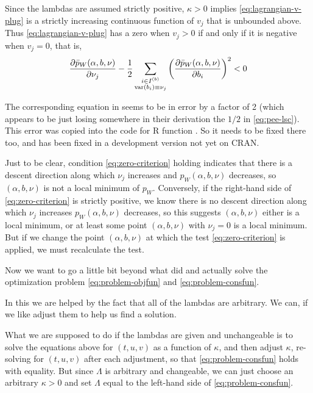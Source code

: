 Since the lambdas are assumed strictly positive, $\kappa > 0$ implies
\eqref{eq:lagrangian-v-plug} is a strictly increasing continuous function
of $v_j$ that is unbounded above.
Thus \eqref{eq:lagrangian-v-plug} has
a zero when $v_j > 0$ if and only if it is negative when $v_j = 0$, that is,
\begin{equation} \label{eq:zero-criterion}
   \frac{\partial \bar{p}_W(\alpha, b, \nu)}{\partial \nu_j}
   - \frac{1}{2} \sum_{\substack{i \in I^{(b)} \\ \operatorname{var}(b_i) \equiv \nu_j}}
   \left( \frac{\partial \bar{p}_W(\alpha, b, \nu)}{\partial b_i} \right)^2
   < 0
\end{equation}

The corresponding equation in \citet[their (20)]{reaster} seems to be in error
by a factor of 2 (which appears to be just losing somewhere in their
derivation the $1/2$ in
\eqref{eq:pee-lsc}).  This error was copied into the code for R function
.  So it needs to be fixed there too,
and has been fixed in a development version not yet on CRAN.

Just to be clear, condition \eqref{eq:zero-criterion} holding indicates
that there is a descent direction along which $\nu_j$ increases and
$p_W(\alpha, b, \nu)$ decreases, so $(\alpha, b, \nu)$ is
not a local minimum of $p_W$.
Conversely, if the right-hand side of \eqref{eq:zero-criterion} is strictly
positive, we know there is no descent direction along which $\nu_j$ increases
$p_W(\alpha, b, \nu)$ decreases,
so this suggests $(\alpha, b, \nu)$ either is a local minimum,
or at least some point $(\alpha, b, \nu)$ with $\nu_j = 0$ is a local
minimum.  But if we change the point $(\alpha, b, \nu)$ at which the
test \eqref{eq:zero-criterion} is applied, we must recalculate the test.

Now we want to go a little bit beyond what \citet{reaster-tr,reaster} did
and actually solve the optimization problem
\eqref{eq:problem-objfun} and \eqref{eq:problem-consfun}.

In this we are helped by the fact that all of the lambdas are arbitrary.
We can, if we like adjust them to help us find a solution.

What we are supposed to do if the lambdas are given and unchangeable is
to solve the equations above for $(t, u, v)$ as a function of $\kappa$,
and then adjust $\kappa$, re-solving for $(t, u, v)$ after each adjustment,
so that \eqref{eq:problem-consfun} holds with equality.
But since $\Lambda$ is arbitrary and changeable, we can just choose an
arbitrary $\kappa > 0$ and set $\Lambda$ equal to the left-hand side of
\eqref{eq:problem-consfun}.

